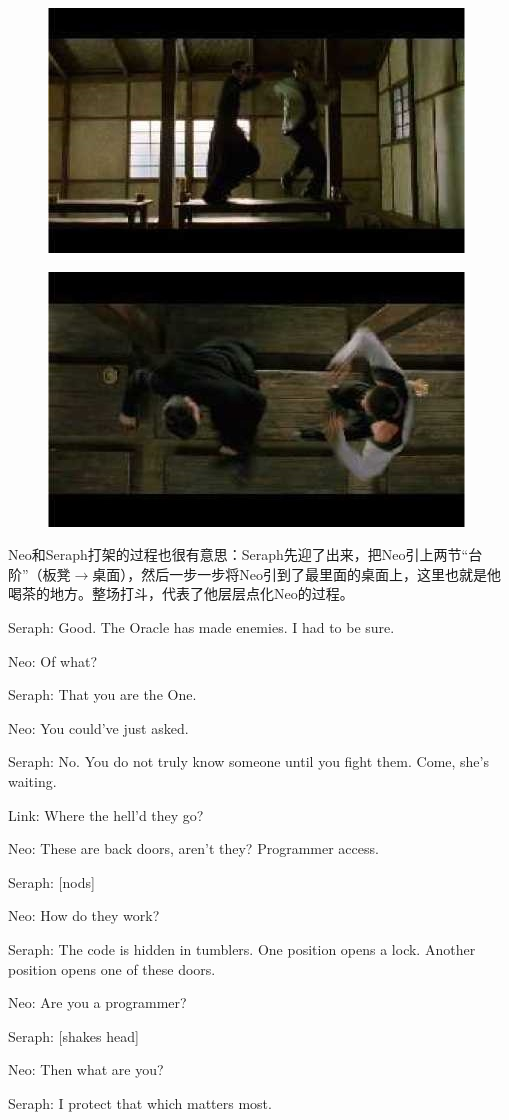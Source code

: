 \documentclass[UTF8]{ctexart}
\newenvironment{myquote}{\color{green} \setlength{\leftskip}{6em} \setlength{\rightskip}{4em} \setlength{\parindent}{-2em}}{\par}
\begin{document}
\begin{figure}[htb]
\centering
\includegraphics[width=0.5\linewidth]{fig/read_reloaded-60}
\end{figure}

\begin{figure}[htb]
\centering
\includegraphics[width=0.5\linewidth]{fig/read_reloaded-60-1}
\end{figure}

Neo和Seraph打架的过程也很有意思：Seraph先迎了出来，把Neo引上两节“台阶”（板凳$\rightarrow$桌面），然后一步一步将Neo引到了最里面的桌面上，这里也就是他喝茶的地方。整场打斗，代表了他层层点化Neo的过程。

\begin{myquote}
Seraph: Good. The Oracle has made enemies. I had to be sure.

Neo: Of what?

Seraph: That you are the One.

Neo: You could've just asked.

Seraph: No. You do not truly know someone until you fight them. Come, she's waiting.

Link: Where the hell'd they go?

Neo: These are back doors, aren't they? Programmer access.

Seraph: [nods]

Neo: How do they work?

Seraph: The code is hidden in tumblers. One position opens a lock. Another position opens one of these doors.

Neo: Are you a programmer?

Seraph: [shakes head]

Neo: Then what are you?

Seraph: I protect that which matters most.
\end{myquote}
\end{document}
